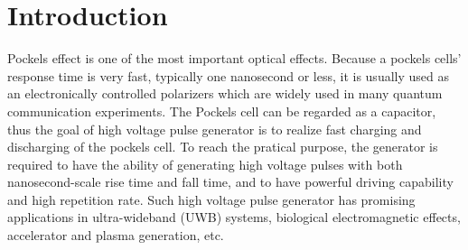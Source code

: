 \documentclass[aip,rsi,reprint,graphicx]{revtex4-1} %
\begin{document}
\pacs{}%

\maketitle %


\section{Introduction}
Pockels effect is one of the most important optical effects. Because a pockels cells' response time is very fast, typically one nanosecond or less, it is usually used as an electronically controlled polarizers which are widely used in many quantum communication experiments. The Pockels cell can be regarded as a capacitor, thus the goal of high voltage pulse generator is to realize fast charging and discharging of the pockels cell. To reach the pratical purpose, the generator is required to have the ability of generating high voltage pulses with both nanosecond-scale rise time and fall time, and to have powerful driving capability and high repetition rate. Such high voltage pulse generator has promising applications in ultra-wideband (UWB) systems, biological electromagnetic effects, accelerator and plasma generation, etc.
\end{document}

